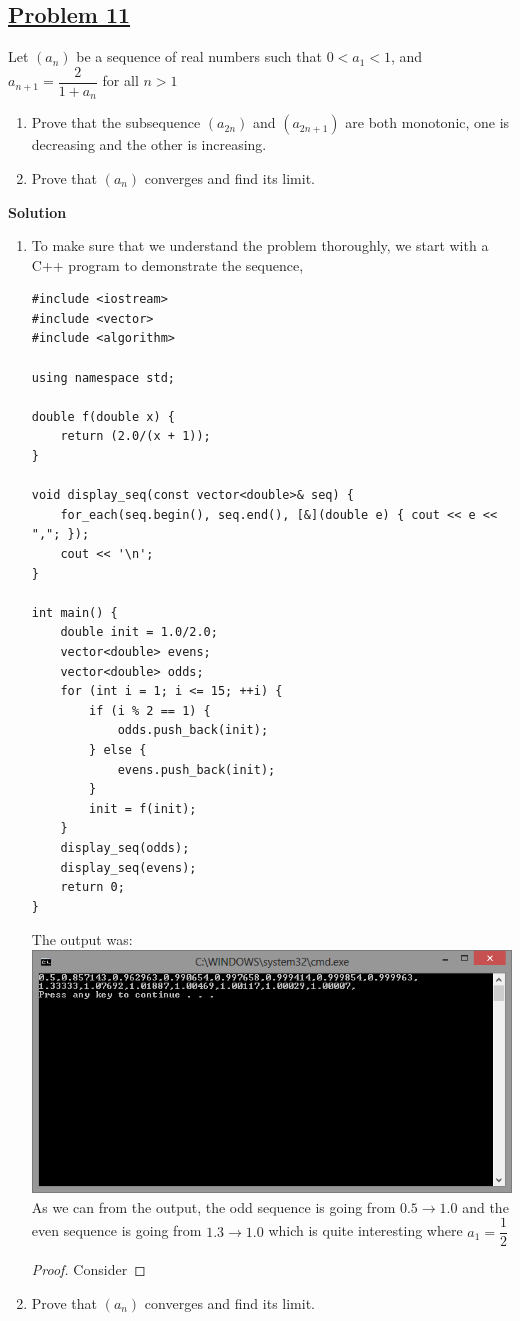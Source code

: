 \documentclass[10pt,letterpaper]{article}
\newcommand{\sol}{\textbf{Solution}}
\begin{document}
	\subsection*{{\color{red}\underline{Problem 11}}}
	Let $(a_n)$ be a sequence of real numbers such that $0 < a_1 < 1$, and $a_{n+1} = \dfrac{2}{1 + a_n}$ for all $n > 1$
	\begin{enumerate}[label=(\roman{*})]
		\item Prove that the subsequence $(a_{2n})$ and $(a_{2n+1})$ are both monotonic, one is decreasing and the other
		is increasing.
		\item Prove that $(a_n)$ converges and find its limit.
	\end{enumerate}
	\sol 
	\begin{enumerate}[label=(\roman{*})]
		\item To make sure that we understand the problem thoroughly, we start with a C++ program to demonstrate
		the sequence,
\begin{verbatim}
#include <iostream>
#include <vector>
#include <algorithm>

using namespace std;

double f(double x) {
	return (2.0/(x + 1));
}

void display_seq(const vector<double>& seq) {
	for_each(seq.begin(), seq.end(), [&](double e) { cout << e << ","; });
	cout << '\n';
}

int main() {
	double init = 1.0/2.0;
	vector<double> evens;
	vector<double> odds;
	for (int i = 1; i <= 15; ++i) {
		if (i % 2 == 1) {
			odds.push_back(init);
		} else {
			evens.push_back(init);
		}
		init = f(init);
	}
	display_seq(odds);
	display_seq(evens);
	return 0;
}
\end{verbatim}
	The output was: \\
	\includegraphics[scale=0.8]{hw4.png} \\
	As we can from the output, the odd sequence is going from $0.5 \rightarrow 1.0$ and the even sequence is 
	going from $1.3 \rightarrow 1.0$ which is quite interesting where $a_1 = \dfrac{1}{2}$
	\begin{proof}
		Consider 
	\end{proof}

		\item Prove that $(a_n)$ converges and find its limit.
	\end{enumerate}
\end{document}

